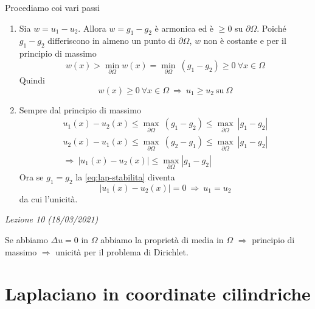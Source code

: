 \documentclass[10pt,a4paper,twoside,openright]{book}
\begin{document}
\begin{dimostrazione}
	Procediamo coi vari passi
	\begin{enumerate}
		\item Sia $\displaystyle w=u_{1} -u_{2}$. Allora $\displaystyle w=g_{1} -g_{2}$ è armonica ed è $\displaystyle \geqslant 0$ su $\displaystyle \partial \Omega $. Poiché $\displaystyle g_{1} -g_{2}$ differiscono in almeno un punto di $\displaystyle \partial \Omega $, $\displaystyle w$ non è costante e per il principio di massimo
		      \begin{equation*}
		      	w(x)  >\min_{\partial \Omega } w(x) =\min_{\partial \Omega } \ (g_{1} -g_{2}) \geqslant 0\ \forall x\in \Omega 
		      \end{equation*}
		      Quindi
		      \begin{equation*}
		      	w(x) \geqslant 0\ \forall x\in \Omega \ \Rightarrow \ u_{1} \geqslant u_{2} \ \mathrm{su} \ \Omega 
		      \end{equation*}
		\item Sempre dal principio di massimo
		      \begin{gather*}
		      	u_{1}(x) -u_{2}(x) \leqslant \max_{\partial \Omega } \ (g_{1} -g_{2}) \leqslant \max_{\partial \Omega } \ | g_{1} -g_{2}| \\
		      	u_{2}(x) -u_{1}(x) \leqslant \max_{\partial \Omega } \ (g_{2} -g_{1}) \leqslant \max_{\partial \Omega } \ | g_{1} -g_{2}| \\
		      	\Rightarrow \ | u_{1}(x) -u_{2}(x)| \leqslant \max_{\partial \Omega }| g_{1} -g_{2}| 
		      \end{gather*}
		      Ora se $\displaystyle g_{1} =g_{2}$ la \eqref{eq:lap-stabilita} diventa 
		      \begin{equation*}
		      	| u_{1}(x) -u_{2}(x)| =0\ \Rightarrow \ u_{1} =u_{2}
		      \end{equation*}
		      da cui l'unicità.
	\end{enumerate}
\end{dimostrazione}
\textit{Lezione 10 (18/03/2021)}

Se abbiamo $\Delta u=0$ in $\Omega $ abbiamo la proprietà di media in $\Omega $ $\Rightarrow $ principio di massimo $\Rightarrow $ unicità per il problema di Dirichlet.
\section{Laplaciano in coordinate cilindriche}
\end{document}
